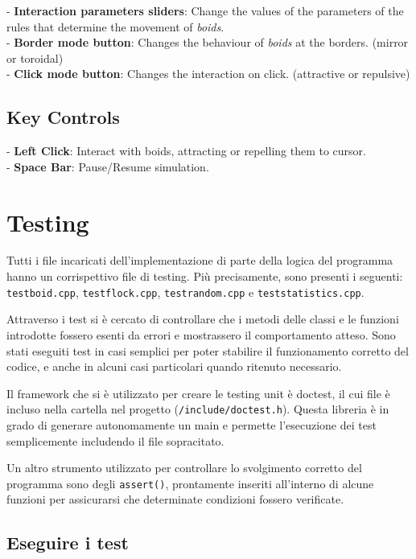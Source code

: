 \documentclass[10pt,a4paper]{article}
\begin{document}
- \textbf{Interaction parameters sliders}: Change the values of the parameters of the rules that determine the movement of \textit{boids}. \\
- \textbf{Border mode button}: Changes the behaviour of \textit{boids} at the borders. (mirror or toroidal) \\
- \textbf{Click mode button}: Changes the interaction on click. (attractive or repulsive)

\subsection{Key Controls}

- \textbf{Left Click}: Interact with boids, attracting or repelling them to cursor. \\
- \textbf{Space Bar}: Pause/Resume simulation.

\newpage

\section{Testing}

Tutti i file incaricati dell'implementazione di parte della logica del programma hanno un corrispettivo file di testing. Più precisamente, sono presenti i seguenti: \texttt{testboid.cpp}, \texttt{testflock.cpp}, \texttt{testrandom.cpp} e \texttt{teststatistics.cpp}.

Attraverso i test si è cercato di controllare che i metodi delle classi e le funzioni introdotte fossero esenti da errori e mostrassero il comportamento atteso. Sono stati eseguiti test in casi semplici per poter stabilire il funzionamento corretto del codice, e anche in alcuni casi particolari quando ritenuto necessario.

Il framework che si è utilizzato per creare le testing unit è doctest, il cui file è incluso nella cartella nel progetto (\texttt{/include/doctest.h}). Questa libreria è in grado di generare autonomamente un main e permette l'esecuzione dei test semplicemente includendo il file sopracitato.

Un altro strumento utilizzato per controllare lo svolgimento corretto del programma sono degli \texttt{assert()}, prontamente inseriti all'interno di alcune funzioni per assicurarsi che determinate condizioni fossero verificate.

\subsection{Eseguire i test}
\end{document}
